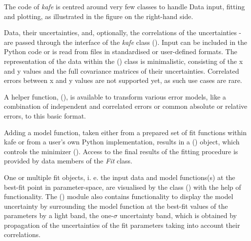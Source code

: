 \documentclass[a4paper,10pt,english]{sphinxmanual}
\begin{document}
The code of \emph{kafe} is centred around very few classes to handle Data input,
fitting and plotting, as illustrated in the figure on the right-hand side.

Data, their uncertainties, and, optionally, the correlations of the
uncertainties - are passed through the interface of the \emph{kafe} class
{\hyperref[module_doc:kafe.dataset.Dataset]{\emph{}}} (). Input can be included in the Python code
or is read from files in standardised or user-defined formats. The representation
of the data within the {\hyperref[module_doc:kafe.dataset.Dataset]{\emph{}}} () class is minimalistic,
consisting of the x and y values and the full covariance matrices of their
uncertainties. Correlated errors between x and y values are not
supported yet, as such use cases are rare.

A helper function, {\hyperref[module_doc:kafe.dataset_tools.build_dataset]{\emph{}}} (), is available
to transform various error models, like a combination of independent
and correlated errors or common absolute or relative errors, to this
basic format.

Adding a model function, taken either from a prepared set of fit
functions within kafe or from a user's own Python implementation,
results in a {\hyperref[module_doc:kafe.fit.Fit]{\emph{}}} () object, which controls the
minimizer {\hyperref[module_doc:kafe.minuit.Minuit]{\emph{}}} (). Access to the final
results of the fitting procedure is provided by data members of
the \emph{Fit} class.

One or multiple fit objects, i. e. the input data and model
functions(s) at the best-fit point in parameter-space, are
visualised by the class {\hyperref[module_doc:kafe.plot.Plot]{\emph{}}} () with the help
of  functionality. The {\hyperref[module_doc:module-plot]{\emph{}}} () module
also contains functionality to display the model uncertainty by
surrounding the model function at the best-fit values of the parameters
by a light band, the one-\(\sigma\) uncertainty band, which is obtained by
propagation of the uncertainties of the fit parameters taking
into account their correlations.
\end{document}
